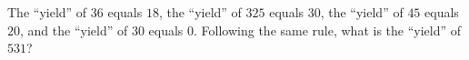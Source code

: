 The ``yield'' of $36$ equals $18$, the ``yield'' of $325$ equals $30$, the ``yield'' of $45$ equals $20$, and the ``yield'' of $30$ equals $0$. Following the same rule, what is the ``yield'' of $531$?
